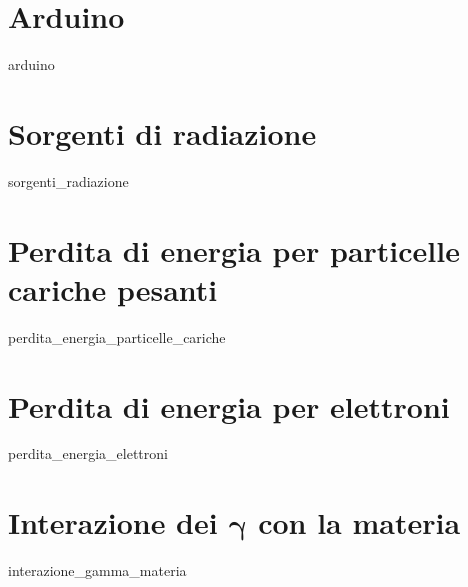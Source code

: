 \documentclass[openany,12pt]{book}
\newcommand{\comment}[1]{}
\begin{document}
\newpage

\pagestyle{fancy}
\fancyhf{}
\fancyhead[LE]{\nouppercase{\textbf{\thepage}\hfill\leftmark}}
\fancyhead[RO]{\nouppercase{\rightmark\hfill\textbf{\thepage}}}


\chapter{Arduino}
{arduino}

\chapter{Sorgenti di radiazione}
{sorgenti_radiazione}

\chapter{Perdita di energia per particelle cariche pesanti}
{perdita_energia_particelle_cariche}

\chapter{Perdita di energia per elettroni}
{perdita_energia_elettroni}


\chapter[Interazione dei \texorpdfstring{$\gamma$}{\textgamma} con la materia]
{Interazione dei $\boldsymbol{\gamma}$ con la materia}
{interazione_gamma_materia}
\end{document}

